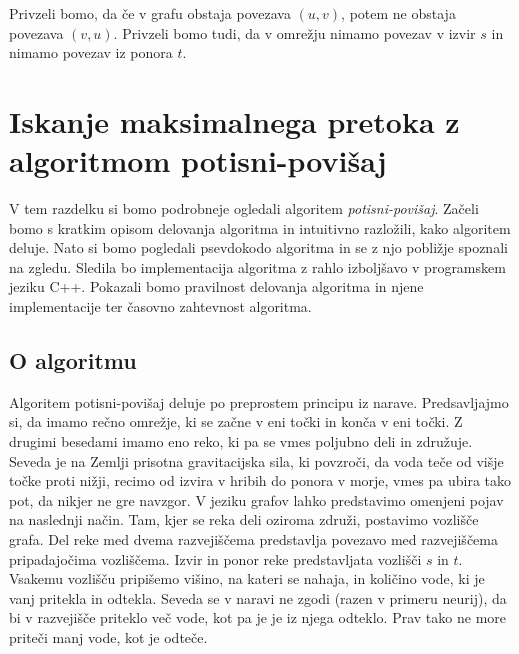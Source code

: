 \documentclass[mat1]{fmfdelo}
\begin{document}
\begin{opomba}
Privzeli bomo, da če v grafu obstaja povezava $(u,v)$, potem ne obstaja povezava $(v,u)$. Privzeli bomo tudi, da v omrežju nimamo povezav v izvir $s$ in nimamo povezav iz ponora $t$.
\end{opomba}







\section{Iskanje maksimalnega pretoka z algoritmom potisni-povišaj}

V tem razdelku si bomo podrobneje ogledali algoritem \textit{potisni-povišaj}. Začeli bomo s kratkim opisom delovanja algoritma in intuitivno razložili, kako algoritem deluje. Nato si bomo pogledali psevdokodo algoritma in se z njo pobližje spoznali na zgledu. Sledila bo implementacija algoritma z rahlo izboljšavo v programskem jeziku C++. Pokazali bomo pravilnost delovanja algoritma in njene implementacije ter časovno zahtevnost algoritma.

\subsection{O algoritmu}
Algoritem potisni-povišaj deluje po preprostem principu iz na\-ra\-ve. Predsavljajmo si, da imamo rečno omrežje, ki se začne v eni točki in konča v eni točki. Z drugimi besedami imamo eno reko, ki pa se vmes poljubno deli in združuje. Seveda je na Zemlji prisotna gravitacijska sila, ki povzroči, da voda teče od višje točke proti nižji, recimo od izvira v hribih do ponora v morje, vmes pa ubira tako pot, da nikjer ne gre navzgor. V jeziku grafov lahko predstavimo omenjeni pojav na naslednji način. Tam, kjer se reka deli oziroma združi, postavimo vozlišče grafa. Del reke med dvema razvejiščema predstavlja povezavo med razvejiščema pripadajočima vozliščema. Izvir in ponor reke predstavljata vozlišči $s$ in $t$. Vsakemu vozlišču pripišemo višino, na kateri se nahaja, in količino vode, ki je vanj pritekla in odtekla. Seveda se v naravi ne zgodi (razen v primeru neurij), da bi v razvejišče priteklo več vode, kot pa je je iz njega odteklo. Prav tako ne more priteči manj vode, kot je odteče.
\end{document}
